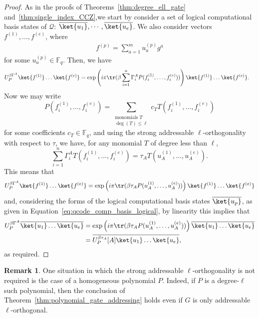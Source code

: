 \documentclass[11pt]{article}
\theoremstyle{definition}
\newtheorem{remark}[theorem]{Remark}
\renewcommand{\le}{\leqslant}
\newcommand{\qcode}{\mathcal{Q}}
\newcommand*{\ol}{\overline}
\begin{document}
\begin{proof}
    As in the proofs of Theorems~\ref{thm:degree_ell_gate} and~\ref{thm:single_index_CCZ},we start by consider a set of logical computational basis states of $\qcode$: $\ol{\ket{u_1}}, \cdots, \ol{\ket{u_e}}$. We also consider vectors $f^{(1)}, \ldots, f^{(e)}$, where
    \begin{align}
        f^{(p)}=\sum_{a=1}^mu_a^{(p)}g^a
    \end{align}
    for some $u_a^{(p)} \in \mathbb{F}_q$. Then, we have
    \begin{align}
        U_P^{\beta\Gamma^A}\ket{f^{(1)}}\ldots\ket{f^{(e)}} &=\exp\left(i\pi\tr(\beta\sum_{i=1}^n\Gamma_i^AP(f_i^{(1)}, \ldots, f_i^{(e)}))\right)\ket{f^{(1)}}\ldots\ket{f^{(e)}}.
    \end{align}
    Now we may write
    \begin{equation}
        P(f_i^{(1)}, \ldots, f_i^{(e)}) = \sum_{\substack{\text{monomials $T$} \\
    \deg(T)\le \ell} } c_T T(f_i^{(1)}, \ldots, f_i^{(e)})
    \end{equation}
    for some coefficients $c_T \in \mathbb{F}_q$, and using the strong addressable $\ell$-orthogonality with respect to $\tau$, we have, for any monomial $T$ of degree less than $\ell$,
    \begin{equation}
        \sum_{i=1}^n\Gamma_i^AT(f_i^{(1)}, \ldots, f_i^{(e)}) = \tau_AT(u_A^{(1)}, \ldots, u_A^{(e)}).
    \end{equation}
    This means that
    \begin{align}
        U_P^{\beta\Gamma^A}\ket{f^{(1)}}\ldots\ket{f^{(e)}} = \exp\left(i\pi\tr(\beta\tau_AP(u_A^{(1)}, \ldots, u_A^{(e)}))\right)\ket{f^{(1)}}\ldots\ket{f^{(e)}}
    \end{align}
    and, considering the forms of the logical computational basis states $\ol{\ket{u_p}}$, as given in Equation~\eqref{eq:qcode_comp_basis_logical}, by linearity this implies that
    \begin{align}
        U_P^{\beta\Gamma^A}\ol{\ket{u_1}\ldots\ket{u_e}} &= \exp\left(i\pi\tr(\beta\tau_AP(u_A^{(1)}, \ldots, u_A^{(e)}))\right)\ol{\ket{u_1}\ldots\ket{u_e}}\\
        &= \ol{U_P^{\beta\tau_A}[A]\ket{u_1}\ldots\ket{u_e}},
    \end{align}
    as required.
\end{proof}
\begin{remark}
    One situation in which the strong addressable $\ell$-orthogonality is not required is the case of a homogeneous polynomial $P$. Indeed, if $P$ is a degree-$\ell$ such polynomial, then the conclusion of Theorem~\ref{thm:polynomial_gate_addressing} holds even if $G$ is only addressable $\ell$-orthogonal.
\end{remark}
\end{document}
